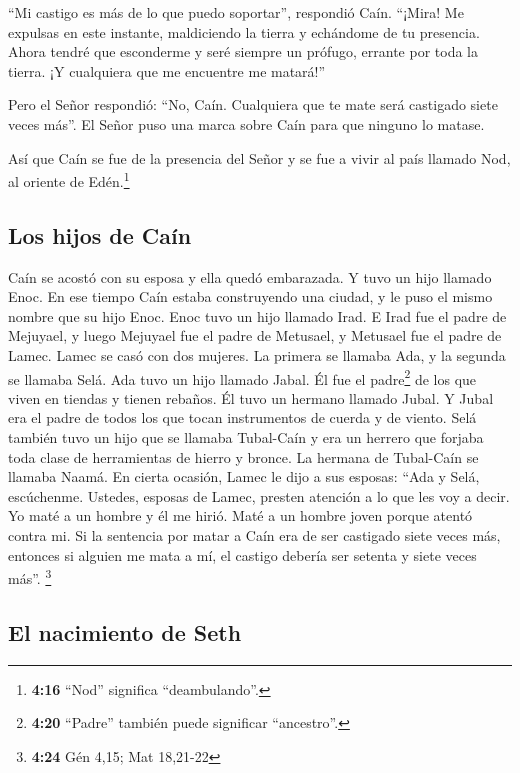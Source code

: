  ``Mi castigo es más de lo que puedo soportar'',
respondió Caín.  ``¡Mira! Me expulsas en este instante,
maldiciendo la tierra y echándome de tu presencia. Ahora tendré que
esconderme y seré siempre un prófugo, errante por toda la tierra. ¡Y
cualquiera que me encuentre me matará!''

 Pero el Señor respondió: ``No, Caín. Cualquiera que te
mate será castigado siete veces más''. El Señor puso una marca sobre
Caín para que ninguno lo matase.

 Así que Caín se fue de la presencia del Señor y se fue a
vivir al país llamado Nod, al oriente de Edén.\footnote{\textbf{4:16}
  ``Nod'' significa ``deambulando''.}

\hypertarget{los-hijos-de-cauxedn}{%
\subsection{Los hijos de Caín}\label{los-hijos-de-cauxedn}}

 Caín se acostó con su esposa y ella quedó embarazada. Y
tuvo un hijo llamado Enoc. En ese tiempo Caín estaba construyendo una
ciudad, y le puso el mismo nombre que su hijo Enoc.  Enoc
tuvo un hijo llamado Irad. E Irad fue el padre de Mejuyael, y luego
Mejuyael fue el padre de Metusael, y Metusael fue el padre de Lamec.
 Lamec se casó con dos mujeres. La primera se llamaba
Ada, y la segunda se llamaba Selá.  Ada tuvo un hijo
llamado Jabal. Él fue el padre\footnote{\textbf{4:20} ``Padre'' también
  puede significar ``ancestro''.} de los que viven en tiendas y tienen
rebaños.  Él tuvo un hermano llamado Jubal. Y Jubal era
el padre de todos los que tocan instrumentos de cuerda y de viento.
 Selá también tuvo un hijo que se llamaba Tubal-Caín y
era un herrero que forjaba toda clase de herramientas de hierro y
bronce. La hermana de Tubal-Caín se llamaba Naamá.  En
cierta ocasión, Lamec le dijo a sus esposas: ``Ada y Selá, escúchenme.
Ustedes, esposas de Lamec, presten atención a lo que les voy a decir. Yo
maté a un hombre y él me hirió. Maté a un hombre joven porque atentó
contra mi.  Si la sentencia por matar a Caín era de ser
castigado siete veces más, entonces si alguien me mata a mí, el castigo
debería ser setenta y siete veces más''. \footnote{\textbf{4:24} Gén
  4,15; Mat 18,21-22}

\hypertarget{el-nacimiento-de-seth}{%
\subsection{El nacimiento de Seth}\label{el-nacimiento-de-seth}}

